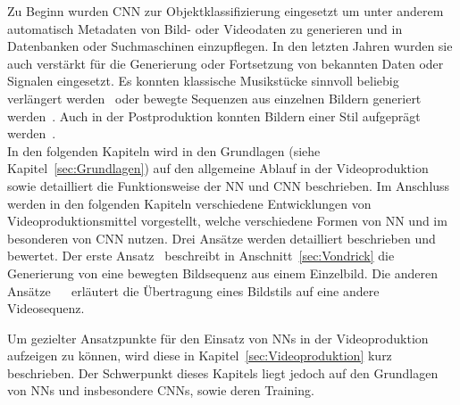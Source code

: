 \documentclass[times, 11pt,twocolumn]{article}
\begin{document}
Zu Beginn wurden CNN zur Objektklassifizierung eingesetzt um unter anderem automatisch Metadaten von Bild- oder Videodaten zu generieren und in Datenbanken oder Suchmaschinen einzupflegen. In den letzten Jahren wurden sie auch verstärkt für die Generierung oder Fortsetzung von bekannten Daten oder Signalen eingesetzt. Es konnten klassische Musikstücke sinnvoll beliebig verlängert werden~\cite{OordDZSVGKSK16} oder bewegte Sequenzen aus einzelnen Bildern generiert werden~\cite{VondrickPT16}. Auch in der Postproduktion konnten Bildern einer Stil aufgeprägt werden~\cite{DeepDream}. \\

In den folgenden Kapiteln wird in den Grundlagen (siehe Kapitel~\ref{sec:Grundlagen}) auf den allgemeine Ablauf in der Videoproduktion sowie detailliert die Funktionsweise der NN und CNN beschrieben. Im Anschluss werden in den folgenden Kapiteln verschiedene Entwicklungen von Videoproduktionsmittel vorgestellt, welche verschiedene Formen von NN und im besonderen von CNN nutzen. Drei Ansätze werden detailliert beschrieben und bewertet. Der erste Ansatz~\cite{VondrickPT16} beschreibt in Anschnitt~\ref{sec:Vondrick} die Generierung von eine bewegten Bildsequenz aus einem Einzelbild. Die anderen Ansätze~ \cite{DeepDream}~\cite{GatysEB15a} erläutert die Übertragung eines Bildstils auf eine andere Videosequenz.


 \label{sec:Grundlagen}
Um gezielter Ansatzpunkte für den Einsatz von NNs in der Videoproduktion aufzeigen zu können, wird diese in Kapitel~\ref{sec:Videoproduktion} kurz beschrieben. Der Schwerpunkt dieses Kapitels liegt jedoch auf den Grundlagen von NNs und insbesondere CNNs, sowie deren Training.
\end{document}

